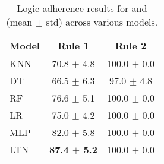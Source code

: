 \begin{table}
  \centering
  \begin{adjustbox}{max width=0.8\textwidth}
    \begin{tabular}{|l|c|c|}
      \hline
      \textbf{Model} & \textbf{Rule 1} & \textbf{Rule 2} \\
      \hline
      \gls{KNN}  & 70.8 $\pm$  4.8   & 100.0 $\pm$  0.0 \\
      \hline
      \gls{DT}   & 66.5 $\pm$  6.3   & 97.0 $\pm$  4.8 \\
      \hline
      \gls{RF}   & 76.6 $\pm$  5.1   & 100.0 $\pm$  0.0 \\
      \hline
      \gls{LR}   & 75.0 $\pm$  4.2   & 100.0 $\pm$  0.0 \\
      \hline
      \gls{MLP}  & 82.0 $\pm$  5.8   & 100.0 $\pm$  0.0 \\
      \hline
      \gls{LTN}  & \textbf{87.4 $\pm$  5.2 }  & 100.0 $\pm$  0.0 \\
      \hline
    \end{tabular}
  \end{adjustbox}
  \caption[Logic adherence results for diabetes rules]{
      Logic adherence results for  and  (mean $\pm$ std) across various models.
  }
  \label{tab:logic-adherence}
\end{table}